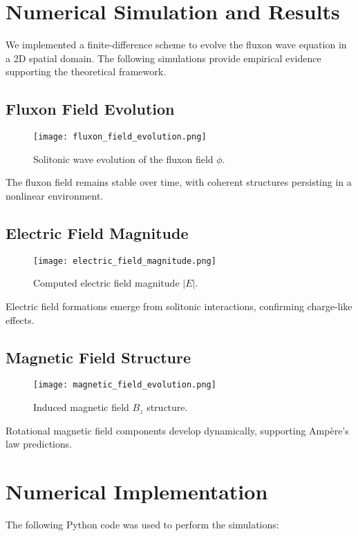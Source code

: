 \documentclass{article}
\begin{document}
\section{Numerical Simulation and Results}
We implemented a finite-difference scheme to evolve the fluxon wave equation in a 2D spatial domain. The following simulations provide empirical evidence supporting the theoretical framework.

\subsection{Fluxon Field Evolution}
\begin{figure}[h]
\centering
\texttt{[image: fluxon\_field\_evolution.png]}
\caption{Solitonic wave evolution of the fluxon field \(\phi\).}
\label{fig:fluxon_field}
\end{figure}

The fluxon field remains stable over time, with coherent structures persisting in a nonlinear environment.

\subsection{Electric Field Magnitude}
\begin{figure}[h]
\centering
\texttt{[image: electric\_field\_magnitude.png]}
\caption{Computed electric field magnitude \(|E|\).}
\label{fig:electric_field}
\end{figure}

Electric field formations emerge from solitonic interactions, confirming charge-like effects.

\subsection{Magnetic Field Structure}
\begin{figure}[h]
\centering
\texttt{[image: magnetic\_field\_evolution.png]}
\caption{Induced magnetic field \(B_z\) structure.}
\label{fig:magnetic_field}
\end{figure}

Rotational magnetic field components develop dynamically, supporting Ampère’s law predictions.

\section{Numerical Implementation}
The following Python code was used to perform the simulations:
\end{document}
